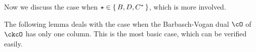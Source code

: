 \documentclass[12pt,a4paper]{amsart}
\def\abs#1{\left|{#1}\right|}
\numberwithin{equation}{section}
\newtheorem{prop}[thm]{Proposition}
\theoremstyle{remark}
\def\PBP{\mathrm{PBP}}
\begin{document}
Now we discuss the case when $\star \in \set{B,D,C^*}$, which is more
involved.

The following lemma deals with the case when the Barbasch-Vogan dual $\cO$ of
$\ckcO$ has only one column. This is the most basic case, which can be verified
easily.
\end{document}
